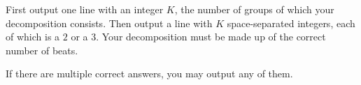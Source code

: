 
First output one line with an integer $K$, the number of groups of which your decomposition consists.
Then output a line with $K$ space-separated integers, each of which is a $2$ or a $3$.
Your decomposition must be made up of the correct number of beats.

If there are multiple correct answers, you may output any of them.
